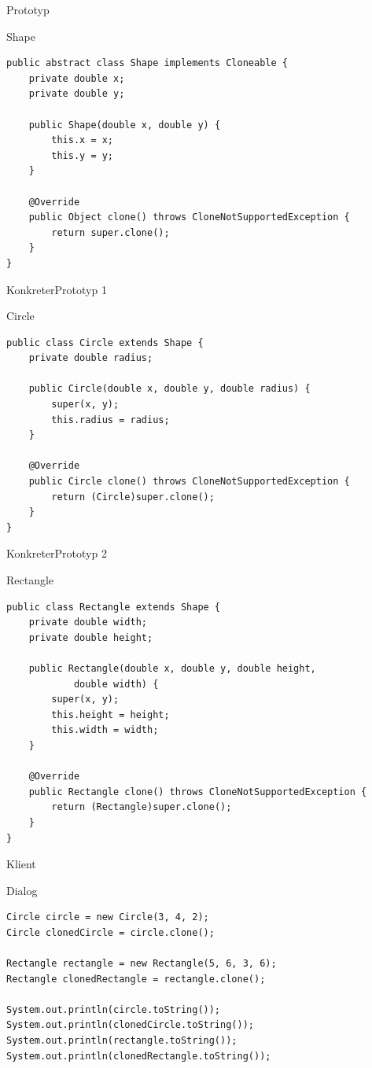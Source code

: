 \begin{frame}[fragile]{Prototyp}
	\begin{exampleblock}{Shape}
 		\begin{lstlisting}
public abstract class Shape implements Cloneable {
	private double x;
	private double y;

	public Shape(double x, double y) {
		this.x = x;
		this.y = y;
	}
	
	@Override
	public Object clone() throws CloneNotSupportedException {
		return super.clone();
	}
}
        \end{lstlisting}
 	\end{exampleblock}
\end{frame}

\begin{frame}[fragile]{KonkreterPrototyp 1}
	\begin{exampleblock}{Circle}
 		\begin{lstlisting}
public class Circle extends Shape {
	private double radius;
	
	public Circle(double x, double y, double radius) {
		super(x, y);
		this.radius = radius;
	}

	@Override
	public Circle clone() throws CloneNotSupportedException {
		return (Circle)super.clone();
	}
}
        \end{lstlisting}
 	\end{exampleblock}
\end{frame}

\begin{frame}[fragile]{KonkreterPrototyp 2}
	\begin{exampleblock}{Rectangle}
 		\begin{lstlisting}
public class Rectangle extends Shape {
	private double width;
	private double height;

	public Rectangle(double x, double y, double height,
            double width) {
		super(x, y);
		this.height = height;
		this.width = width;
	}
	
	@Override
	public Rectangle clone() throws CloneNotSupportedException {
		return (Rectangle)super.clone();
	}
}
        \end{lstlisting}
 	\end{exampleblock}
\end{frame}

\begin{frame}[fragile]{Klient}
	\begin{exampleblock}{Dialog}
 		\begin{lstlisting}
Circle circle = new Circle(3, 4, 2);
Circle clonedCircle = circle.clone();

Rectangle rectangle = new Rectangle(5, 6, 3, 6);
Rectangle clonedRectangle = rectangle.clone();

System.out.println(circle.toString());
System.out.println(clonedCircle.toString());
System.out.println(rectangle.toString());
System.out.println(clonedRectangle.toString());
        \end{lstlisting}
 	\end{exampleblock}
\end{frame}

